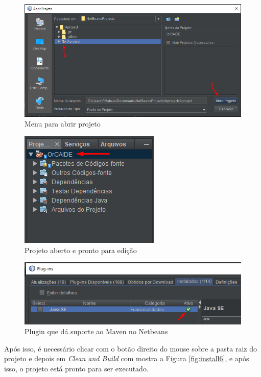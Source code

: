\documentclass{bcc}
\begin{document}
\begin{figure}[H]
\centering
\includegraphics[width=.9\textwidth]{Figuras/install3.png}
\caption{Menu para abrir projeto} 
\label{fig:install3}
\end{figure}

\begin{figure}[H]
\centering
\includegraphics[width=.5\textwidth]{Figuras/install4.png}
\caption{Projeto aberto e pronto para edição} 
\label{fig:install4}
\end{figure}

\begin{figure}[H]
\centering
\includegraphics[width=.9\textwidth]{Figuras/install5.png}
\caption{Plugin que dá suporte ao Maven no Netbeans} 
\label{fig:install5}
\end{figure}

Após isso, é necessário clicar com o botão direito do mouse sobre a pasta raiz do projeto e depois em \textit{Clean and Build} com mostra a Figura \ref{fig:install6}, e após isso, o projeto está pronto para ser executado.
\end{document}
